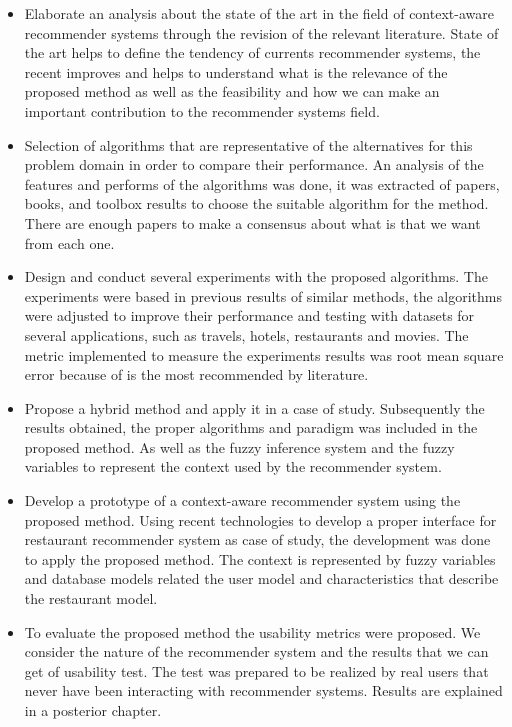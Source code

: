 \begin{itemize}  
\item Elaborate an analysis about the state of the art in the field
of context-aware recommender systems through  the revision of 
the relevant literature. State of the art helps to define the tendency
of currents recommender systems, the recent improves and helps to understand
what is the relevance of the proposed method as well as the feasibility and 
how we can make an important contribution to the recommender systems field.
\item Selection of algorithms that are representative of the alternatives for
this problem domain in order to compare their performance. An analysis of the 
features and performs of the algorithms was done, it was extracted of papers,
books, and toolbox results to choose the suitable algorithm
for the method. There are enough papers to make a consensus about 
what is that we want from each one. 
\item Design and conduct several experiments with the proposed 
algorithms. The experiments were based in previous results of similar 
methods, the algorithms were adjusted to improve their performance and 
testing with datasets for several applications, such as travels, hotels, 
restaurants and movies. The  metric implemented to measure the experiments 
results was root mean square error because of is the most recommended 
by literature.
\item Propose a hybrid method and apply it in a case of study. 
Subsequently the results obtained, the proper algorithms and paradigm was 
included in the proposed method. As well as the fuzzy inference system and 
the fuzzy variables to represent the context used by the 
recommender system.
\item Develop a prototype of a context-aware recommender system 
using the proposed method. Using recent technologies to develop a proper 
interface for restaurant recommender system as case of study, 
the development was done to apply the proposed method. The 
context is represented by fuzzy variables and database models 
related the user model and characteristics
that describe the restaurant model.
\item To evaluate the proposed method the usability metrics were proposed. 
We consider the nature of the recommender system and the results 
that we can get of usability test. The test was prepared to be realized
by real users that never have been interacting with recommender systems. 
Results are explained in a posterior chapter.
\end{itemize} 

